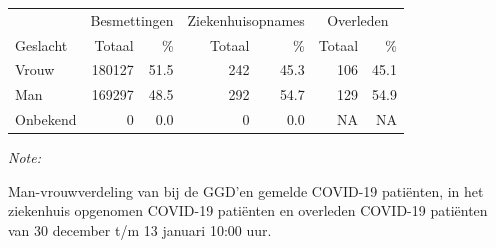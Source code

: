 \documentclass[
  english,
  man,floatsintext]{apa6}
\begin{document}
\begin{table}
\centering\begingroup\fontsize{11}{13}\selectfont

\begin{threeparttable}
\begin{tabular}{lrrrrrr}
\toprule
\multicolumn{1}{c}{ } & \multicolumn{2}{c}{Besmettingen} & \multicolumn{2}{c}{Ziekenhuisopnames} & \multicolumn{2}{c}{Overleden} \\
\cmidrule(l{3pt}r{3pt}){2-3} \cmidrule(l{3pt}r{3pt}){4-5} \cmidrule(l{3pt}r{3pt}){6-7}
Geslacht & Totaal & \% & Totaal & \% & Totaal & \%\\
\midrule
Vrouw & 180127 & 51.5 & 242 & 45.3 & 106 & 45.1\\
Man & 169297 & 48.5 & 292 & 54.7 & 129 & 54.9\\
Onbekend & 0 & 0.0 & 0 & 0.0 & NA & NA\\
\bottomrule
\end{tabular}
\begin{tablenotes}
\item \textit{Note: } 
\item Man-vrouwverdeling van bij de GGD’en gemelde COVID-19 patiënten, in het ziekenhuis opgenomen COVID-19 patiënten en overleden COVID-19 patiënten van 30 december t/m 13 januari 10:00 uur.
\end{tablenotes}
\end{threeparttable}
\endgroup{}
\end{table}
\newpage
\end{document}
